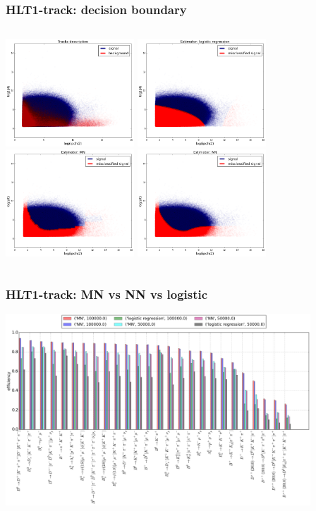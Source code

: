 \documentclass[xcolor=svgnames]{beamer}
\begin{document}
\begin{frame}\frametitle{HLT1-track: decision boundary}
\begin{columns}
  \column{2.5in}
	\hspace*{0.5cm} \includegraphics[width=1.9in]{images/track-db.png} \hfill
	\hspace*{0.5cm} \includegraphics[width=1.9in]{images/log-track-db.png} \hfill
  \column{2.5in}
	\includegraphics[width=1.9in]{images/mn-track-db.png} \hfill
	\includegraphics[width=1.9in]{images/nn-track-db.png} \hfill
\end{columns}
\end{frame}


\begin{frame}\frametitle{HLT1-track: MN vs NN vs logistic}
\includegraphics[width=4.5in]{images/track.png}
\end{frame}
\end{document}

